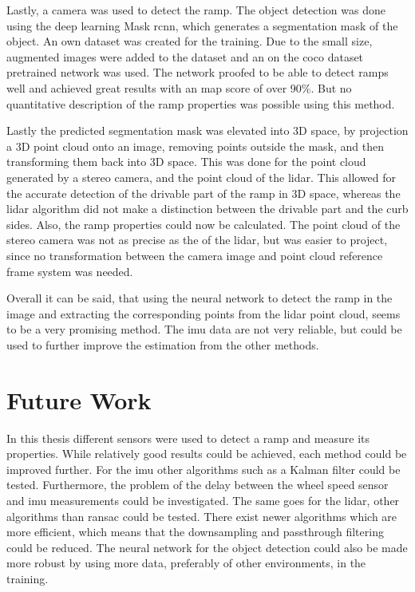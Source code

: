 Lastly, a camera was used to detect the ramp.
The object detection was done using the deep learning Mask \gls{rcnn}, which generates a segmentation mask of the object.
An own dataset was created for the training.
Due to the small size, augmented images were added to the dataset and an on the \gls{coco} dataset pretrained network was used.
The network proofed to be able to detect ramps well and achieved great results with an \gls{map} score of over 90\%.
But no quantitative description of the ramp properties was possible using this method.

Lastly the predicted segmentation mask was elevated into 3D space, by projection a 3D point cloud onto an image, removing points outside the mask, and then transforming them back into 3D space.
This was done for the point cloud generated by a stereo camera, and the point cloud of the \gls{lidar}.
This allowed for the accurate detection of the drivable part of the ramp in 3D space, whereas the \gls{lidar} algorithm did not make a distinction between the drivable part and the curb sides.
Also, the ramp properties could now be calculated.
The point cloud of the stereo camera was not as precise as the of the \gls{lidar}, but was easier to project, since no transformation between the camera image and point cloud reference frame system was needed.

Overall it can be said, that using the neural network to detect the ramp in the image and extracting the corresponding points from the \gls{lidar} point cloud, seems to be a very promising method.
The \gls{imu} data are not very reliable, but could be used to further improve the estimation from the other methods.



\section{Future Work}
In this thesis different sensors were used to detect a ramp and measure its properties.
While relatively good results could be achieved, each method could be improved further.
For the \gls{imu} other algorithms such as a Kalman filter could be tested.
Furthermore, the problem of the delay between the wheel speed sensor and \gls{imu} measurements could be investigated.
The same goes for the \gls{lidar}, other algorithms than \gls{ransac} could be tested.
There exist newer algorithms which are more efficient, which means that the downsampling and passthrough filtering could be reduced.
The neural network for the object detection could also be made more robust by using more data, preferably of other environments, in the training.

